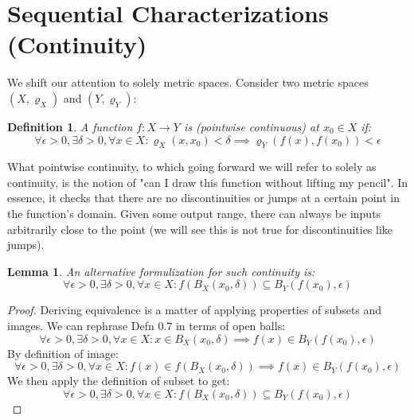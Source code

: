 \documentclass{exam}
\newtheorem{lem}{Lemma}[section]
\newtheorem{defn}{Definition}[section]
\begin{document}
\section*{Sequential Characterizations (Continuity)}
We shift our attention to solely metric spaces. Consider two metric spaces $(X, \varrho_X)$ and $(Y, \varrho_Y)$:
\begin{defn}
A function $f: X \xrightarrow{} Y$ is (pointwise continuous) at $x_0 \in X$ if:
\begin{equation*}
  \forall \epsilon > 0, \exists \delta > 0, \forall x \in X: \varrho_X(x, x_0) < \delta \implies \varrho_Y(f(x), f(x_0)) < \epsilon
\end{equation*}
\end{defn}
What pointwise continuity, to which going forward we will refer to solely as continuity, is the notion of "can I draw this function without lifting my pencil". In essence, it checks that there are no discontinuities or jumps at a certain point in the function's domain. Given some output range, there can always be inputs arbitrarily close to the point (we will see this is not true for discontinuities like jumps).

\begin{lem}
An alternative formulization for such continuity is:
\begin{equation*}
  \forall \epsilon > 0, \exists \delta > 0, \forall x \in X: f(B_X(x_0, \delta)) \subseteq B_Y(f(x_0), \epsilon)
\end{equation*}
\end{lem}
\begin{proof}
Deriving equivalence is a matter of applying properties of subsets and images. We can rephrase Defn 0.7 in terms of open balls:
\begin{equation*}
  \forall \epsilon > 0, \exists \delta > 0, \forall x \in X: x \in B_X(x_0, \delta) \implies f(x) \in B_Y(f(x_0), \epsilon)
\end{equation*}
By definition of image:
\begin{equation*}
  \forall \epsilon > 0, \exists \delta > 0, \forall x \in X: f(x) \in f(B_X(x_0, \delta)) \implies f(x) \in B_Y(f(x_0), \epsilon)
\end{equation*}
We then apply the definition of subset to get:
\begin{equation*}
  \forall \epsilon >0, \exists \delta > 0, \forall x \in X: f(B_X(x_0, \delta)) \subseteq B_Y(f(x_0), \epsilon)
\end{equation*}
\end{proof}
\end{document}
